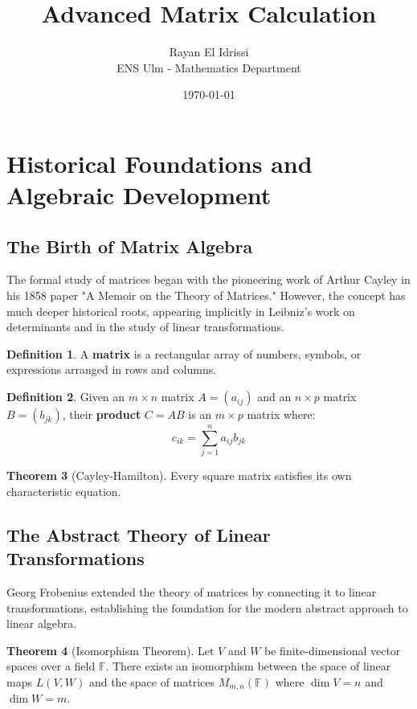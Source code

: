 \documentclass[12pt,a4paper]{article}
\title{Advanced Matrix Calculation}
\author{Rayan El Idrissi\\ENS Ulm - Mathematics Department}
\date{\today}
\theoremstyle{definition}
\newtheorem{theorem}{Theorem}[section]
\newtheorem{definition}[theorem]{Definition}
\begin{document}
\maketitle
\tableofcontents
\newpage

\section{Historical Foundations and Algebraic Development}

\subsection{The Birth of Matrix Algebra}
The formal study of matrices began with the pioneering work of Arthur Cayley in his 1858 paper "A Memoir on the Theory of Matrices." However, the concept has much deeper historical roots, appearing implicitly in Leibniz's work on determinants and in the study of linear transformations.

\begin{definition}
A \textbf{matrix} is a rectangular array of numbers, symbols, or expressions arranged in rows and columns.
\end{definition}

\begin{definition}
Given an $m \times n$ matrix $A = (a_{ij})$ and an $n \times p$ matrix $B = (b_{jk})$, their \textbf{product} $C = AB$ is an $m \times p$ matrix where:
\[c_{ik} = \sum_{j=1}^{n} a_{ij}b_{jk}\]
\end{definition}

\begin{theorem}[Cayley-Hamilton]
Every square matrix satisfies its own characteristic equation.
\end{theorem}

\subsection{The Abstract Theory of Linear Transformations}
Georg Frobenius extended the theory of matrices by connecting it to linear transformations, establishing the foundation for the modern abstract approach to linear algebra.

\begin{theorem}[Isomorphism Theorem]
Let $V$ and $W$ be finite-dimensional vector spaces over a field $\mathbb{F}$. There exists an isomorphism between the space of linear maps $L(V,W)$ and the space of matrices $M_{m,n}(\mathbb{F})$ where $\dim V = n$ and $\dim W = m$.
\end{theorem}
\end{document}
